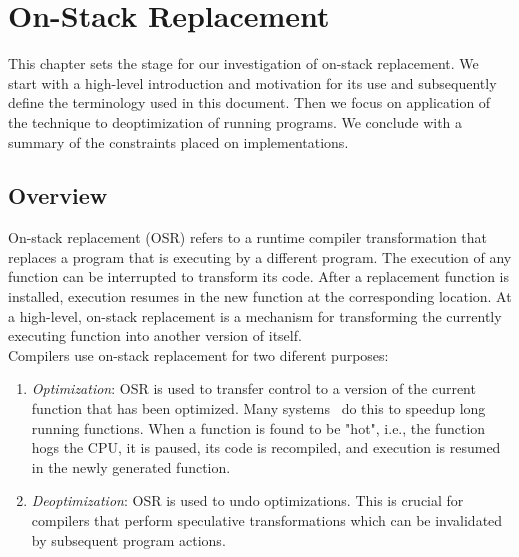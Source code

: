 \chapter{On-Stack Replacement} %
\label{Chapter2} %
\newcommand{\keyword}[1]{\textbf{#1}}
\newcommand{\tabhead}[1]{\textbf{#1}}
\newcommand{\code}[1]{\texttt{#1}}
\newcommand{\file}[1]{\texttt{\bfseries#1}}
\newcommand{\option}[1]{\texttt{\itshape#1}}

This chapter sets the stage for our investigation of on-stack
replacement. We start with a high-level introduction and motivation for its
use and subsequently define the terminology used in this document. Then we
focus on application of the technique to deoptimization of running programs.
We conclude with a summary of the constraints placed on implementations.

\section{Overview}\label{WhyOSRInteresting}

On-stack replacement (OSR) refers to a runtime compiler transformation that
replaces a program that is executing by a different program.
The execution of any function can be interrupted to transform its code.
After a replacement function is installed, execution resumes in the new function at the corresponding location. 
At a high-level, on-stack replacement is a mechanism for transforming the currently executing function into another version of itself.\\  

Compilers use on-stack replacement for two diferent purposes:
\begin{enumerate}
\item {\it Optimization}: OSR is used to transfer control to a version
  of the current function that has been optimized.  Many
  systems~\cite{paleczny2001java, lameed2013modular, holzle1992debugging,
    fink2003design, soman2006efficient, duboscq2014speculation, OSRKit,
    WebKitFTL} do this to speedup long running functions.  When a function
  is found to be "hot", i.e., the function hogs the CPU, it is paused, its
  code is recompiled, and execution is resumed in the newly generated
  function.
\item {\it Deoptimization}: OSR is used to undo optimizations. This is
  crucial for compilers that perform speculative transformations which can
  be invalidated by subsequent program actions.
\end{enumerate}\\

